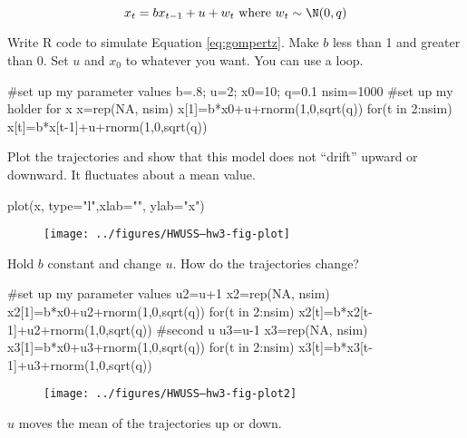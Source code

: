 \begin{equation}
x_t = b x_{t-1}+u+w_t \text{ where } w_t \sim \N(0,q)  
\label{eq:gompertz}\end{equation}

\begin{wideenumerate}
\item Write R code to simulate Equation \ref{eq:gompertz}.  Make $b$ less than 1 and greater than 0.  Set $u$ and $x_0$ to whatever you want.  You can use a \verb@for@ loop. 
\begin{Schunk}
\begin{Sinput}
 #set up my parameter values
 b=.8; u=2; x0=10; q=0.1
 nsim=1000
 #set up my holder for x
 x=rep(NA, nsim)
 x[1]=b*x0+u+rnorm(1,0,sqrt(q))
 for(t in 2:nsim) x[t]=b*x[t-1]+u+rnorm(1,0,sqrt(q))
\end{Sinput}
\end{Schunk}

\item Plot the trajectories and show that this model does not ``drift'' upward or downward.  It fluctuates about a mean value.
\begin{Schunk}
\begin{Sinput}
 plot(x, type="l",xlab="", ylab="x")
\end{Sinput}
\end{Schunk}
\begin{figure}[htp]
\begin{center}
\texttt{[image: ../figures/HWUSS--hw3-fig-plot]}
\end{center}
\end{figure}

\item Hold $b$ constant and change $u$.  How do the trajectories change?
\begin{Schunk}
\begin{Sinput}
 #set up my parameter values
 u2=u+1
 x2=rep(NA, nsim)
 x2[1]=b*x0+u2+rnorm(1,0,sqrt(q))
 for(t in 2:nsim) x2[t]=b*x2[t-1]+u2+rnorm(1,0,sqrt(q))
 #second u
 u3=u-1
 x3=rep(NA, nsim)
 x3[1]=b*x0+u3+rnorm(1,0,sqrt(q))
 for(t in 2:nsim) x3[t]=b*x3[t-1]+u3+rnorm(1,0,sqrt(q))
 
\end{Sinput}
\end{Schunk}
\begin{figure}[htp]
\begin{center}
\texttt{[image: ../figures/HWUSS--hw3-fig-plot2]}
\end{center}
\end{figure}
$u$ moves the mean of the trajectories up or down.



\end{wideenumerate}
